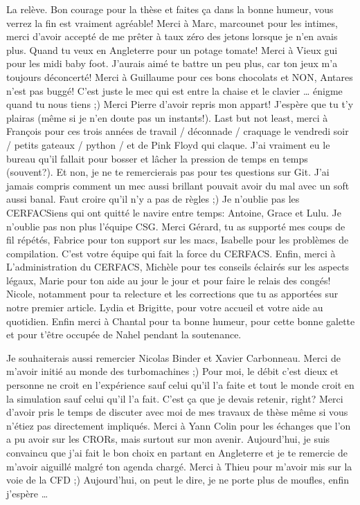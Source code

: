 La relève. Bon courage pour la thèse et faites ça dans la bonne humeur, vous
verrez la fin est vraiment agréable!
Merci à Marc, marcounet pour les intimes, merci d'avoir accepté de me prêter à taux
zéro des
jetons lorsque je n'en avais plus. Quand tu veux en Angleterre pour un
potage tomate! Merci à Vieux gui pour les midi baby foot. J'aurais aimé
te battre un peu plus, car ton jeux m'a toujours déconcerté! 
Merci à Guillaume pour ces bons chocolats et NON, Antares n'est pas buggé!
C'est juste le mec qui est entre la chaise et le clavier \ldots{} 
énigme quand tu nous tiens ;) 
Merci Pierre d'avoir repris mon appart! J'espère que tu t'y plairas
(même si je n'en doute pas un instants!).
Last but not least, merci à François pour ces
trois années de travail / déconnade / craquage le vendredi soir / 
petits gateaux / python / et de Pink Floyd qui claque. J'ai vraiment
eu le bureau qu'il fallait pour bosser et lâcher la pression de temps
en temps (souvent?). Et non, je ne te remercierais pas
pour tes questions sur Git. J'ai jamais compris comment 
un mec aussi brillant pouvait avoir du mal
avec un soft aussi banal. Faut croire qu'il n'y a pas de règles ;)
Je n'oublie pas les CERFACSiens qui ont quitté le navire entre temps:
Antoine, Grace et Lulu.
Je n'oublie pas non plus l'équipe CSG. Merci Gérard,
tu as supporté mes coups de fil répétés, Fabrice pour ton
support sur les macs, Isabelle pour les problèmes de
compilation. C'est votre équipe qui fait la force du CERFACS.
Enfin, merci à L'administration du CERFACS, Michèle pour tes
conseils éclairés sur les aspects légaux, Marie pour
ton aide au jour le jour et pour faire le relais des 
congés! Nicole, notamment pour ta relecture et les
corrections que tu as apportées sur notre premier
article. Lydia et Brigitte, pour votre accueil
et votre aide au quotidien.
Enfin merci à Chantal pour ta bonne humeur, pour 
cette bonne galette et pour t'être occupée de
Nahel pendant la soutenance.

Je souhaiterais aussi remercier Nicolas Binder et
Xavier Carbonneau. 
Merci de m'avoir initié au monde des turbomachines ;) Pour moi,
le débit c'est dieux et personne ne croit en l'expérience
sauf celui qu'il l'a faite et tout le monde croit en la
simulation sauf celui qu'il l'a fait. 
C'est ça que je devais retenir, right?
Merci d'avoir pris le temps de 
discuter avec moi de mes travaux de thèse même si
vous n'étiez pas directement impliqués.
Merci à Yann Colin pour les échanges que l'on a pu avoir
sur les CRORs, mais surtout sur mon avenir. Aujourd'hui,
je suis convaincu que j'ai fait le bon choix en partant
en Angleterre et je te remercie
de m'avoir aiguillé malgré ton agenda chargé.
Merci à Thieu pour m'avoir mis sur la voie de la CFD ;)
Aujourd'hui, on peut le dire, je ne porte plus de moufles, enfin
j'espère \ldots{}

